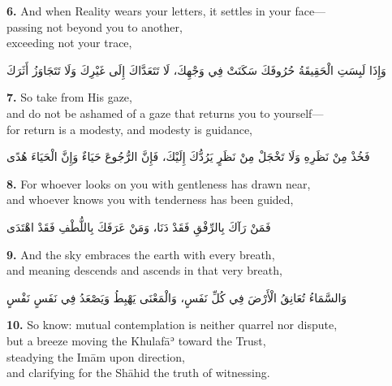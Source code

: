 \documentclass[11pt,a4paper,twoside]{book}
\begin{document}
\vspace{1em}
{\color{indigo}\bfseries 6.}\quad
And when Reality wears your letters, it settles in your face---\\
passing not beyond you to another,\\
exceeding not your trace,

\begin{flushright}
{\arabicfont
وَإِذَا لَبِسَتِ الْحَقِيقَةُ حُرُوفَكَ سَكَنَتْ فِي وَجْهِكَ،
لَا تَتَعَدَّاكَ إِلَى غَيْرِكَ
وَلَا تَتَجَاوَزُ أَثَرَكَ}
\end{flushright}

\vspace{1em}
{\color{indigo}\bfseries 7.}\quad
So take from His gaze,\\
and do not be ashamed of a gaze that returns you to yourself---\\
for return is a modesty, and modesty is guidance,

\begin{flushright}
{\arabicfont
فَخُذْ مِنْ نَظَرِهِ وَلَا تَخْجَلْ مِنْ نَظَرٍ يَرُدُّكَ إِلَيْكَ،
فَإِنَّ الرُّجُوعَ حَيَاءٌ
وَإِنَّ الْحَيَاءَ هُدًى}
\end{flushright}

\vspace{1em}
{\color{indigo}\bfseries 8.}\quad
For whoever looks on you with gentleness has drawn near,\\
and whoever knows you with tenderness has been guided,

\begin{flushright}
{\arabicfont
فَمَنْ رَآكَ بِالرِّفْقِ فَقَدْ دَنَا،
وَمَنْ عَرَفَكَ بِاللُّطْفِ فَقَدْ اهْتَدَى}
\end{flushright}

\vspace{1em}
{\color{indigo}\bfseries 9.}\quad
And the sky embraces the earth with every breath,\\
and meaning descends and ascends in that very breath,

\begin{flushright}
{\arabicfont
وَالسَّمَاءُ تُعَانِقُ الْأَرْضَ فِي كُلِّ نَفَسٍ،
وَالْمَعْنَى يَهْبِطُ وَيَصْعَدُ فِي نَفَسٍ نَفْسٍ}
\end{flushright}

\vspace{1em}
{\color{indigo}\bfseries 10.}\quad
So know: mutual contemplation is neither quarrel nor dispute,\\
but a breeze moving the Khulafāʾ toward the Trust,\\
steadying the Imām upon direction,\\
and clarifying for the Shāhid the truth of witnessing.
\end{document}
